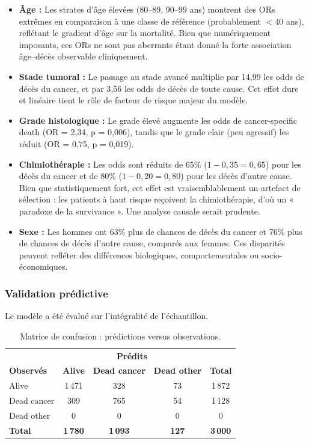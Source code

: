 \documentclass[12pt,a4paper]{article}
\begin{document}
\begin{itemize}
    \item \textbf{Âge :} Les strates d'âge élevées (80–89, 90–99 ans) montrent des ORs extrêmes en comparaison à une classe de référence (probablement $< 40$ ans), reflétant le gradient d'âge sur la mortalité. Bien que numériquement imposants, ces ORs ne sont pas aberrants étant donné la forte association âge–décès observable cliniquement.
    
    \item \textbf{Stade tumoral :} Le passage au stade avancé multiplie par 14{,}99 les odds de décès du cancer, et par 3{,}56 les odds de décès de toute cause. Cet effet dure et linéaire tient le rôle de facteur de risque majeur du modèle.
    
    \item \textbf{Grade histologique :} Le grade élevé augmente les odds de cancer-specific death (OR = 2{,}34, p = 0{,}006), tandis que le grade clair (peu agressif) les réduit (OR = 0{,}75, p = 0{,}019).
    
    \item \textbf{Chimiothérapie :} Les odds sont réduits de 65\% ($1 - 0{,}35 = 0{,}65$) pour les décès du cancer et de 80\% ($1 - 0{,}20 = 0{,}80$) pour les décès d'autre cause. Bien que statistiquement fort, cet effet est vraisemblablement un artefact de sélection : les patients à haut risque reçoivent la chimiothérapie, d'où un « paradoxe de la survivance ». Une analyse causale serait prudente.
    
    \item \textbf{Sexe :} Les hommes ont 63\% plus de chances de décès du cancer et 76\% plus de chances de décès d'autre cause, comparés aux femmes. Ces disparités peuvent refléter des différences biologiques, comportementales ou socio-économiques.
\end{itemize}

\subsubsection{Validation prédictive}

Le modèle a été évalué sur l'intégralité de l'échantillon.

\begin{table}[H]
\centering
\caption{Matrice de confusion : prédictions versus observations.}
\label{tab:confusion_matrix}
\begin{tabular}{@{}lcccc@{}}
\toprule
 & \multicolumn{3}{c}{\textbf{Prédits}} & \\
\textbf{Observés} & \textbf{Alive} & \textbf{Dead cancer} & \textbf{Dead other} & \textbf{Total} \\
\midrule
Alive & 1\,471 & 328 & 73 & 1\,872 \\
Dead cancer & 309 & 765 & 54 & 1\,128 \\
Dead other & 0 & 0 & 0 & 0 \\
\midrule
\textbf{Total} & \textbf{1\,780} & \textbf{1\,093} & \textbf{127} & \textbf{3\,000} \\
\bottomrule
\end{tabular}
\end{table}
\end{document}
